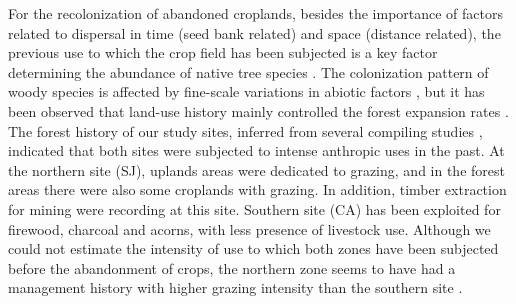 For the recolonization of abandoned croplands, besides the importance of factors related to dispersal in time (seed bank related) and space (distance related), the previous use to which the crop field has been subjected is a key factor determining the abundance of native tree species \autocites{HermyVerheyen2007LegaciesPresentday,NavarroGonzalezetal2013WeightLanduse}. The colonization pattern of woody species is affected by fine-scale variations in abiotic factors \autocite{Milderetal2013ColonizationPatterns,Leverkusetal2016ShiftingDemographic}, but it has been observed that land-use history mainly controlled the forest expansion rates \autocites{AlvarezMartinezetal2014InfluenceLand,Perringetal2016GlobalEnvironmental}. The forest history of our study sites, inferred from several compiling studies \autocites{MorenoLlorcaetal2014CaracterizacionFuentes, Titos1990, PerezLuqueetal2020LanduseLegacies,MorenoLlorcaetal2016HistoricalAnalysis,MesaTorres2009,JimenezOlivenciaetal2015EvolucionUsos}, indicated that both sites were subjected to intense anthropic uses in the past. At the northern site (SJ), uplands areas were dedicated to grazing, and in the forest areas there were also some croplands with grazing. In addition, timber extraction for mining were recording at this site. Southern site (CA) has been exploited for firewood, charcoal and acorns, with less presence of livestock use. Although we could not estimate the intensity of use to which both zones have been subjected before the abandonment of crops, the northern zone seems to have had a management history with higher grazing intensity than the southern site \autocite{MorenoLlorcaetal2016HistoricalAnalysis, MorenoLlorcaetal2014CaracterizacionFuentes,MorenoLlorcaZamora2012CaracterizacionCarga}. 

